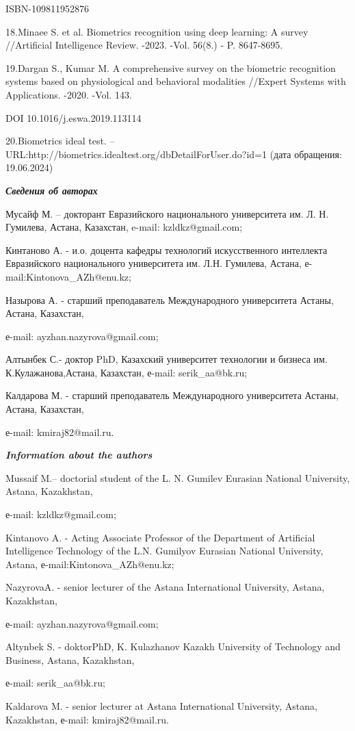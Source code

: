 ISBN-109811952876

18.Minaee S. et al. Biometrics recognition using deep learning: A survey
//Artificial Intelligence Review. -2023. -Vol. 56(8.) - P. 8647-8695.

19.Dargan S., Kumar M. A comprehensive survey on the biometric
recognition systems based on physiological and behavioral modalities
//Expert Systems with Applications. -2020. -Vol. 143.

DOI 10.1016/j.eswa.2019.113114

20.Biometrics ideal test.
--URL:http://biometrics.idealtest.org/dbDetailForUser.do?id=1 (дата
обращения: 19.06.2024)

\emph{{\bfseries Сведения об авторах}}

Мусайф М. -- докторант Евразийского национального университета им. Л. Н.
Гумилева, Астана, Казахстан, e-mail: kzldkz@gmail.com;

Кинтаново А. - и.о. доцента кафедры технологий искусственного интеллекта
Евразийского национального университета им. Л.Н. Гумилева, Астана,
е-mail:Kintonova\_AZh@enu.kz;

Назырова А. - старший преподаватель Международного университета Астаны,
Астана, Казахстан,

е-mail: ayzhan.nazyrova@gmail.com;

Алтынбек С.- доктор PhD, Казахский университет технологии и бизнеса им.
К.Кулажанова,Астана, Казахстан, е-mail: serik\_aa@bk.ru;

Калдарова М. - старший преподаватель Международного университета Астаны,
Астана, Казахстан,

е-mail: kmiraj82@mail.ru.

\emph{{\bfseries Information about the authors}}

Mussaif M.-- doctorial student of the L. N. Gumilev Eurasian National
University, Astana, Kazakhstan,

е-mail: kzldkz@gmail.com;

Kintanovo A. - Acting Associate Professor of the Department of
Artificial Intelligence Technology of the L.N. Gumilyov Eurasian
National University, Astana, е-mail:Kintonova\_AZh@enu.kz;

NazyrovaA. - senior lecturer of the Astana International University,
Astana, Kazakhstan,

е-mail: ayzhan.nazyrova@gmail.com;

Altynbek S. - doktorPhD, K. Kulazhanov Kazakh University of Technology
and Business, Astana, Kazakhstan,

е-mail: serik\_aa@bk.ru;

Kaldarova M. - senior lecturer at Astana International University,
Astana, Kazakhstan, е-mail: kmiraj82@mail.ru.
